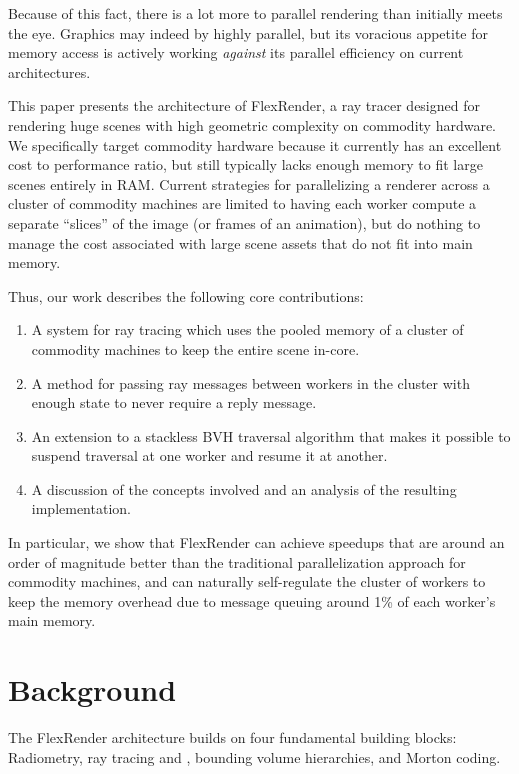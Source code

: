 \documentclass[a4paper,twoside]{article}
\begin{document}
Because of this fact, there is a lot more to parallel rendering than initially
meets the eye. Graphics may indeed by highly parallel, but its voracious
appetite for memory access is actively working \emph{against} its parallel
efficiency on current architectures.

This paper presents the architecture of FlexRender, a ray tracer designed for
rendering huge scenes with high geometric complexity on commodity hardware. We
specifically target commodity hardware because it currently has an excellent
cost to performance ratio, but still typically lacks enough memory to fit large
scenes entirely in RAM. Current strategies for parallelizing a renderer across
a cluster of commodity machines are limited to having each worker compute a
separate ``slices'' of the image (or frames of an animation), but do nothing to
manage the cost associated with large scene assets that do not fit into main
memory.

Thus, our work describes the following core contributions:

\begin{enumerate}
    \item A system for ray tracing which uses the pooled memory of a cluster of
        commodity machines to keep the entire scene in-core.
    \item A method for passing ray messages between workers in the cluster with
        enough state to never require a reply message.
    \item An extension to a stackless BVH traversal algorithm \cite{hapala:2011}
        that makes it possible to suspend traversal at one worker and resume it
        at another.
    \item A discussion of the concepts involved and an analysis of the resulting
        implementation.
\end{enumerate}

In particular, we show that FlexRender can achieve speedups that are around an
order of magnitude better than the traditional parallelization approach for
commodity machines, and can naturally self-regulate the cluster of workers to
keep the memory overhead due to message queuing around 1\% of each worker's
main memory.

\section{Background}
\label{background}

The FlexRender architecture builds on four fundamental building blocks:
Radiometry, ray tracing \cite{appel:1968} and \cite{whitted:1980}, bounding
volume hierarchies, and Morton coding.
\end{document}
